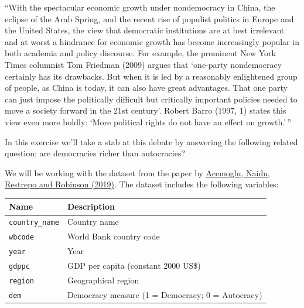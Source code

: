 \documentclass[
  11pt,
  letterpaper]{article}
\begin{document}
``With the spectacular economic growth under nondemocracy in China, the
eclipse of the Arab Spring, and the recent rise of populist politics in
Europe and the United States, the view that democratic institutions are
at best irrelevant and at worst a hindrance for economic growth has
become increasingly popular in both academia and policy discourse. For
example, the prominent New York Times columnist Tom Friedman (2009)
argues that `one-party nondemocracy certainly has its drawbacks. But
when it is led by a reasonably enlightened group of people, as China is
today, it can also have great advantages. That one party can just impose
the politically difficult but critically important policies needed to
move a society forward in the 21st century'. Robert Barro (1997, 1)
states this view even more boldly: `More political rights do not have an
effect on growth.'\,''

In this exercise we'll take a stab at this debate by answering the
following related question: are democracies richer than autocracies?

We will be working with the dataset from the paper by
\href{https://economics.mit.edu/sites/default/files/publications/Democracy\%20Does\%20Cause\%20Growth.pdf}{Acemoglu,
Naidu, Restrepo and Robinson (2019)}. The dataset includes the following
variables:

\begin{longtable}[]{@{}
  >{\raggedright\arraybackslash}p{}
  >{\raggedright\arraybackslash}p{}@{}}
\toprule\noalign{}
\begin{minipage}[b]{\linewidth}\raggedright
Name
\end{minipage} & \begin{minipage}[b]{\linewidth}\raggedright
Description
\end{minipage} \\
\midrule\noalign{}
\endhead
\bottomrule\noalign{}
\endlastfoot
\texttt{country\_name} & Country name \\
\texttt{wbcode} & World Bank country code \\
\texttt{year} & Year \\
\texttt{gdppc} & GDP per capita (constant 2000 US\$) \\
\texttt{region} & Geographical region \\
\texttt{dem} & Democracy measure (1 = Democracy; 0 = Autocracy) \\
\end{longtable}
\end{document}

